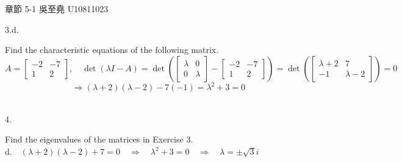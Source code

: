 \documentclass[12pt]{book}
\author{andersonwu2000}
\begin{document}
\begin{CJK}{UTF8}{bsmi}

\hfill 章節 5-1 吳至堯 U10811023

3.d. \begin{minipage}[t]{\dimexpr\linewidth-2em}
Find the characteristic equations of the following matrix. \\
$A=\begin{bmatrix} -2 & -7 \\ 1 & 2 \end{bmatrix},\quad \det(\lambda I-A)=\det(\begin{bmatrix} \lambda & 0 \\ 0  & \lambda \end{bmatrix} - \begin{bmatrix} -2 & -7 \\ 1 & 2 \end{bmatrix}) = \det(\begin{bmatrix} \lambda +2 & 7 \\ -1  & \lambda-2 \end{bmatrix}) = 0$
\[
\Rightarrow(\lambda+2)(\lambda-2)-7(-1)=\lambda^2+3=0
\]
\end{minipage}\\

4. \begin{minipage}[t]{\dimexpr\linewidth}
Find the eigenvalues of the matrices in Exercise 3. \\
d.$\quad (\lambda+2)(\lambda-2)+7=0\quad\Rightarrow\quad\lambda^2 +3=0 \quad \Rightarrow \quad \lambda=\pm \sqrt{3}i$\\
\end{minipage}\\


\end{CJK}
\end{document}
